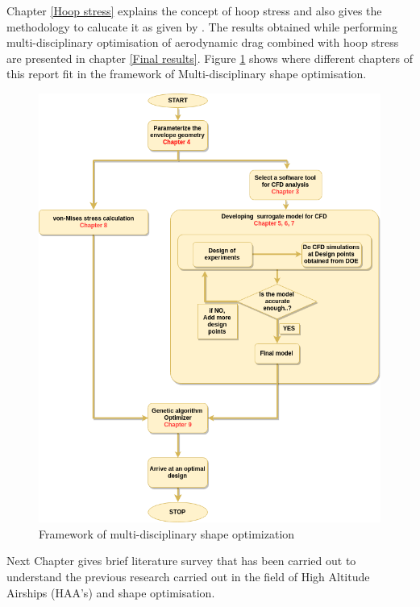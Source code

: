 Chapter \ref{Hoop stress} explains the concept of hoop stress and also gives the methodology to calucate it as given by \cite{alam2017thesis}. The results obtained while performing multi-disciplinary optimisation of aerodynamic drag combined with hoop stress are presented in chapter \ref{Final results}.
Figure \ref{Report layout} shows where different chapters of this report fit in the framework of Multi-disciplinary shape optimisation.

\begin{figure}[H]
	\includegraphics[width=\textwidth]{layout/layout.png} 
	\caption{Framework of multi-disciplinary shape optimization}
	\label{Report layout} %
\end{figure}
Next Chapter gives brief literature survey that has been carried out to understand the previous research carried out in the field of High Altitude Airships (HAA's) and shape optimisation.





